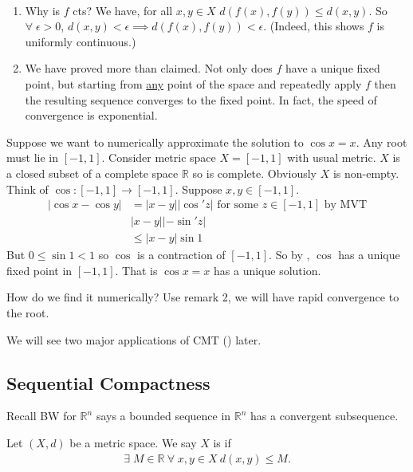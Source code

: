 \begin{remark} \
    \begin{enumerate}
        \item Why is $f$ cts? We have, for all $x, y \in X$ $d(f(x), f(y)) \leq d(x, y)$.
        So $\forall \; \epsilon > 0$, $d(x, y) < \epsilon \implies d(f(x), f(y)) < \epsilon$.
        (Indeed, this shows $f$ is uniformly continuous.)
        \item We have proved more than claimed.
        Not only does $f$ have a unique fixed point, but starting from \underline{any} point of the space and repeatedly apply $f$ then the resulting sequence converges to the fixed point.
        In fact, the speed of convergence is exponential.
    \end{enumerate} 
\end{remark} 

\begin{example}[Application]
    Suppose we want to numerically approximate the solution to $\cos x = x$.
    Any root must lie in $[-1, 1]$.
    Consider metric space $X = [-1, 1]$ with usual metric.
    $X$ is a closed subset of a complete space $\mathbb{R}$ so is complete.
    Obviously $X$ is non-empty.
    Think of $\cos : [-1, 1] \to [-1, 1]$.
    Suppose $x, y \in [-1, 1]$.
    \begin{align*}
        |\cos x - \cos y| &= |x-y| |\cos'z| \text{ for some $z \in [-1, 1]$ by MVT} \\
        & |x-y| |-\sin'z| \\
        &\leq |x-y| \sin 1
    \end{align*} 
    But $0 \leq \sin 1 < 1$ so $\cos$ is a contraction of $[-1, 1]$.
    So by \nameref{thm:19}, $\cos$ has a unique fixed point in $[-1, 1]$.
    That is $\cos x = x$ has a unique solution.

    How do we find it numerically?
    Use remark 2, we will have rapid convergence to the root.
\end{example} 

We will see two major applications of CMT () later.

\subsection{Sequential Compactness}
Recall BW for $\mathbb{R}^n$ says a bounded sequence in $\mathbb{R}^n$ has a convergent subsequence.

\begin{definition}[Bounded]
    Let $(X, d)$ be a metric space.
    We say $X$ is  if
    \begin{align*}
        \exists \; M \in \mathbb{R} \ \forall \; x, y \in X \ d(x, y) \leq M.
    \end{align*} 
\end{definition} 

